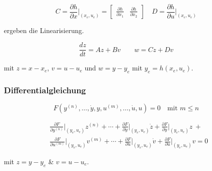 \documentclass[
  10pt,
  a4paper,
  twocolumn]{article}
\numberwithin{equation}{section}
\begin{document}
\[
C=\frac{\partial h}{\partial x}\biggr\rvert_{(x_e,u_e)}=\begin{bmatrix}
\frac{\partial h}{\partial x_1} & \frac{\partial h}{\partial x_2}
\end{bmatrix}
\quad D=\frac{\partial h}{\partial u}\biggr\rvert_{(x_e,u_e)}
\]

ergeben die Linearisierung.

\[
\frac{dz}{dt}=Az+Bv\qquad w=Cz+Dv
\]

mit \(z=x-x_e\), \(v=u-u_e\) und \(w=y-y_e\) mit \(y_e=h(x_e,u_e)\).

\hypertarget{differentialgleichung}{%
\subsubsection{Differentialgleichung}\label{differentialgleichung}}

\[
F(y^{(n)},\ldots,\dot{y},y,u^{(m)},\ldots,\dot{u},u)=0\quad\text{mit } m\leq n
\]

\[
\begin{split} 
&\frac{\partial{F}}{\partial{y^{(n)}}}\biggr\rvert_{(y_e,u_e)} z^{(n)}+ 
 \cdots+ 
 \frac{\partial{F}}{\partial{\dot{y}}}\biggr\rvert_{(y_e,u_e)} \dot{z}+ 
 \frac{\partial{F}}{\partial{y}}\biggr\rvert_{(y_e,u_e)} z\ + \\
&\frac{\partial{F}}{\partial{u^{(m)}}}\biggr\rvert_{(y_e,u_e)} v^{(m)}+
 \cdots+ 
 \frac{\partial{F}}{\partial{\dot{u}}}\biggr\rvert_{(y_e,u_e)} \dot{v}+
 \frac{\partial{F}}{\partial{u}}\biggr\rvert_{(y_e,u_e)} v = 0 
\end{split}
\]

mit \(z=y-y_e\) \& \(v=u-u_e\).
\end{document}
